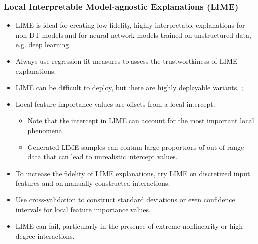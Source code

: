 \documentclass[11pt,
               aspectratio=169
               ]{beamer}
\begin{document}
		\begin{frame}
		
			\frametitle{Local Interpretable Model-agnostic Explanations (LIME)}
			
			\begin{itemize}
			
				\item LIME is ideal for creating low-fidelity, highly interpretable explanations for non-DT models and for neural network models trained on unstructured data, e.g. deep learning.
			
				\item Always use regression fit measures to assess the trustworthiness of LIME explanations.
			
				\item LIME can be difficult to deploy, but there are highly deployable variants. \cite{lime-sup}; \cite{h2o_mli_booklet}
			
				\item Local feature importance values are offsets from a local intercept.
				
				\begin{itemize}
					
					\item Note that the intercept in LIME can account for the most important local phenomena.
					
					\item Generated LIME samples can contain large proportions of out-of-range data that can lead to unrealistic intercept values. 
					 
				\end{itemize}
			
			\end{itemize}
			
		\end{frame}
	
		\begin{frame}[t]
		
			\begin{itemize}
		
				\item To increase the fidelity of LIME explanations, try LIME on discretized input features and on manually constructed interactions.

				\item Use cross-validation to construct standard deviations or even confidence intervals for local feature importance values.

				\item LIME can fail, particularly in the presence of extreme nonlinearity or high-degree interactions.
		
			\end{itemize}
		
		\end{frame}
\end{document}
